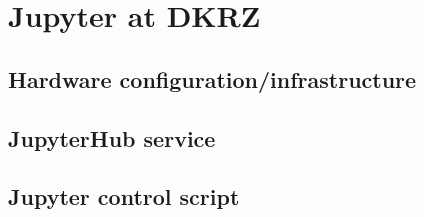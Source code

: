 \section{Jupyter at DKRZ}
\label{sect:jupyter-at-dkrz}

\subsection{Hardware configuration/infrastructure}

\subsection{JupyterHub service}

\subsection{Jupyter control script}
